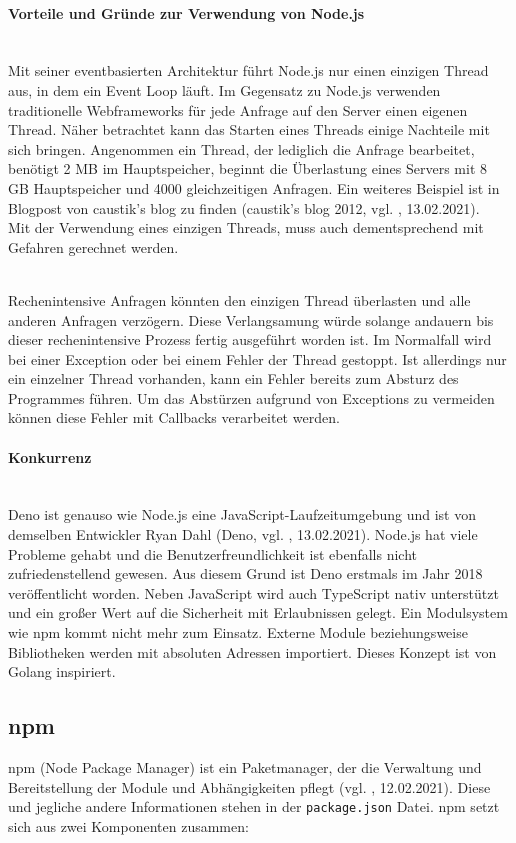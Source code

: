\paragraph{Vorteile und Gründe zur Verwendung von Node.js}
\mbox{}\\
Mit seiner eventbasierten Architektur führt Node.js nur einen einzigen Thread aus, in dem ein Event Loop läuft. Im Gegensatz zu Node.js verwenden traditionelle Webframeworks für jede Anfrage auf den Server einen eigenen Thread. Näher betrachtet kann das Starten eines Threads einige Nachteile mit sich bringen. Angenommen ein Thread, der lediglich die Anfrage bearbeitet, benötigt 2 MB im Hauptspeicher, beginnt die Überlastung eines Servers mit 8 GB Hauptspeicher und 4000 gleichzeitigen Anfragen. Ein weiteres Beispiel ist in Blogpost von caustik's blog zu finden (caustik's blog 2012, vgl. \cite{nodejs_blogpost_2012}, 13.02.2021).\\
Mit der Verwendung eines einzigen Threads, muss auch dementsprechend mit Gefahren gerechnet werden.

\mbox{}\\
Rechenintensive Anfragen könnten den einzigen Thread überlasten und alle anderen Anfragen verzögern. Diese Verlangsamung würde solange andauern bis dieser rechenintensive Prozess fertig ausgeführt worden ist. Im Normalfall wird bei einer Exception oder bei einem Fehler der Thread gestoppt. Ist allerdings nur ein einzelner Thread vorhanden, kann ein Fehler bereits zum Absturz des Programmes führen. Um das Abstürzen aufgrund von Exceptions zu vermeiden können diese Fehler mit Callbacks verarbeitet werden.

\paragraph{Konkurrenz}
\mbox{}\\
Deno ist genauso wie Node.js eine JavaScript-Laufzeitumgebung und ist von demselben Entwickler Ryan Dahl (Deno, vgl. \cite{deno_2021}, 13.02.2021). Node.js hat viele Probleme gehabt und die Benutzerfreundlichkeit ist ebenfalls nicht zufriedenstellend gewesen. Aus diesem Grund ist Deno erstmals im Jahr 2018 veröffentlicht worden. Neben JavaScript wird auch TypeScript nativ unterstützt und ein großer Wert auf die Sicherheit mit Erlaubnissen gelegt. Ein Modulsystem wie npm kommt nicht mehr zum Einsatz. Externe Module beziehungsweise Bibliotheken werden mit absoluten Adressen importiert. Dieses Konzept ist von Golang inspiriert.

\subsection{npm}
npm (Node Package Manager) ist ein Paketmanager, der die Verwaltung und Bereitstellung der Module und Abhängigkeiten pflegt (vgl. \cite{npm_2021}, 12.02.2021). Diese und jegliche andere Informationen stehen in der \texttt{package.json} Datei. npm setzt sich aus zwei Komponenten zusammen:

